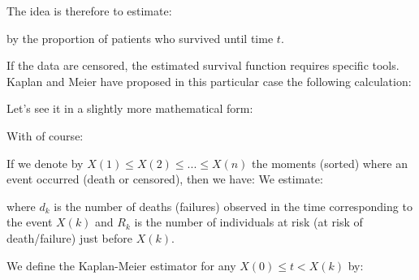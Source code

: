	The idea is therefore to estimate:
	
	by the proportion of patients who survived until time $t$.
	
	If the data are censored, the estimated survival function requires specific tools. Kaplan and Meier have proposed in this particular case the following calculation:
	
	Let's see it in a slightly more mathematical form:
	
	With of course:
	
	If we denote by $X(1)\leq X(2)\leq ...\leq X(n)$ the moments (sorted) where an event occurred (death or censored), then we have:
	We estimate:
	
	where $d_k$ is the number of deaths (failures) observed in the time corresponding to the event $X(k)$ and $R_k$ is the number of individuals at risk (at risk of death/failure) just before $X(k)$.
	
	We define the Kaplan-Meier estimator for any $X(0)\leq t <X(k)$ by:
	
